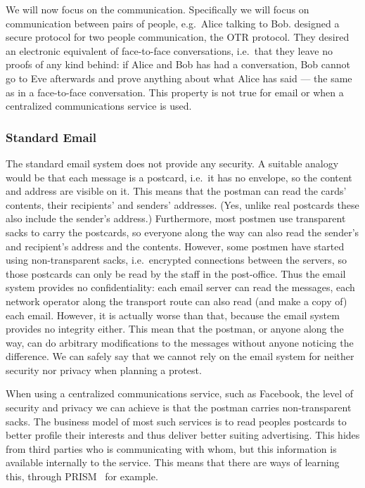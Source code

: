 We will now focus on the communication.
Specifically we will focus on communication between pairs of people, e.g.\ 
Alice talking to Bob.
\citeauthor{otr2004} designed a secure protocol for two people communication, 
the \ac{OTR} protocol.
They desired an electronic equivalent of face-to-face conversations, i.e.\ that 
they leave no proofs of any kind behind:
if Alice and Bob has had a conversation, Bob cannot go to Eve afterwards and 
prove anything about what Alice has said --- the same as in a face-to-face 
conversation.
This property is not true for email or when a centralized communications 
service is used.

\subsubsection{Standard Email}

The standard email system does not provide any security.
A suitable analogy would be that each message is a postcard, i.e.\ it has no 
envelope, so the content and address are visible on it.
This means that the postman can read the cards' contents, their recipients' and
senders' addresses.
(Yes, unlike real postcards these also include the sender's address.)
Furthermore, most postmen use transparent sacks to carry the postcards, so 
everyone along the way can also read the sender's and recipient's address and 
the contents.
However, some postmen have started using non-transparent sacks, i.e.\ encrypted 
connections between the servers, so those postcards can only be read by the 
staff in the post-office.
Thus the email system provides no confidentiality: each email server can read 
the messages, each network operator along the transport route can also read 
(and make a copy of) each email.
However, it is actually worse than that, because the email system provides no 
integrity either.
This mean that the postman, or anyone along the way, can do arbitrary 
modifications to the messages without anyone noticing the difference.
We can safely say that we cannot rely on the email system for neither security 
nor privacy when planning a protest.

When using a centralized communications service, such as Facebook, the level of
security and privacy we can achieve is that the postman carries non-transparent
sacks.
The business model of most such services is to read peoples postcards to better
profile their interests and thus deliver better suiting advertising.
This hides from third parties who is communicating with whom, but this 
information is available internally to the service.
This means that there are ways of learning this, through PRISM~\cite{Prism} for 
example.

